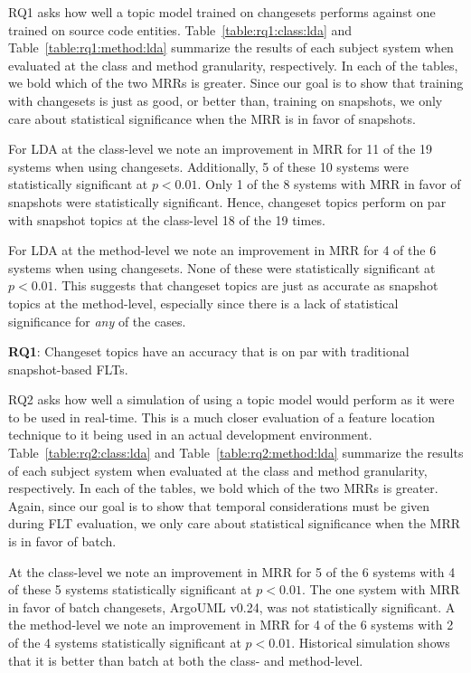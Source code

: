 RQ1 asks how well a topic model trained on changesets performs against
one trained on source code entities.
Table~\ref{table:rq1:class:lda} and Table~\ref{table:rq1:method:lda}
summarize the results of each subject system when
evaluated at the class and method granularity, respectively.
In each of the tables, we bold which of the two MRRs is greater.
Since our goal is to show that training with changesets is just as good, or
better than, training on snapshots, we only care about statistical significance
when the MRR is in favor of snapshots.

For LDA at the class-level we note an improvement in MRR for 11 of the 19 systems when using changesets.
Additionally, 5 of these 10 systems were statistically significant at $p<0.01$.
Only 1 of the 8 systems with MRR in favor of snapshots were statistically significant.
Hence, changeset topics perform on par with snapshot topics at the class-level 18 of the 19 times.

For LDA at the method-level we note an improvement in MRR for 4 of the 6 systems when using changesets.
None of these were statistically significant at $p<0.01$.
This suggests that changeset topics are just as accurate as snapshot topics at the method-level,
especially since there is a lack of statistical significance for \emph{any} of the cases.

\begin{framed}
    \textbf{RQ1}:
    Changeset topics have an accuracy that is on par with traditional snapshot-based FLTs.
\end{framed}



RQ2 asks how well a simulation of using a topic model would perform as it were to be used in real-time.
This is a much closer evaluation of a feature location technique to it being used in an actual development environment.
Table~\ref{table:rq2:class:lda} and Table~\ref{table:rq2:method:lda}
summarize the results of each subject system when
evaluated at the class and method granularity, respectively.
In each of the tables, we bold which of the two MRRs is greater.
Again, since our goal is to show that temporal considerations must be given
during FLT evaluation, we only care about statistical significance when the MRR
is in favor of batch.

At the class-level we note an improvement in MRR for 5 of the 6 systems
with 4 of these 5 systems statistically significant at $p<0.01$.
The one system with MRR in favor of batch changesets, ArgoUML v0.24, was not statistically significant.
A the method-level we note an improvement in MRR for 4 of the 6 systems
with 2 of the 4 systems statistically significant at $p<0.01$.
Historical simulation shows that it is better than batch at both the class- and method-level.

